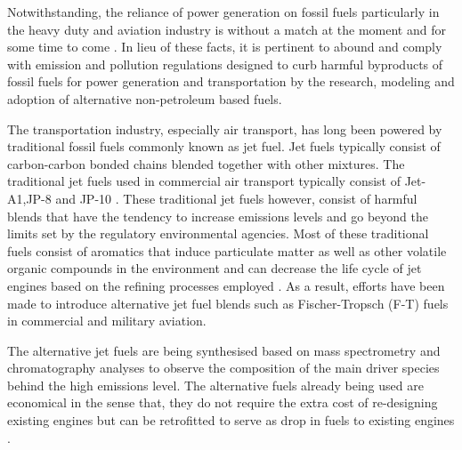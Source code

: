 Notwithstanding, the reliance of power generation on fossil fuels particularly in the heavy duty and aviation industry is without a match at the moment and for some time to come \cite{NationalsAcademiesofSciences2016CommercialResearch}. In lieu of these facts, it is pertinent to abound and comply with emission and pollution regulations designed to curb harmful byproducts of fossil fuels for power generation and transportation by the research, modeling and adoption of alternative non-petroleum based fuels. 

The transportation industry, especially air transport, has long been powered by traditional fossil fuels commonly known as jet fuel. Jet fuels typically consist of carbon-carbon bonded chains blended together with other mixtures. The traditional jet fuels used in commercial air transport typically consist of Jet-A1,JP-8 and JP-10 \cite{NationalsAcademiesofSciences2016CommercialResearch}. These traditional jet fuels however, consist of harmful blends that have the tendency to increase emissions levels and go beyond the limits set by the regulatory environmental agencies. Most of these traditional fuels consist of aromatics that induce particulate matter as well as other volatile organic compounds in the environment and can decrease the life cycle of jet engines based on the refining processes employed \cite{Corporan2007EmissionsFuel}. As a result, efforts have been made to introduce alternative jet fuel blends such as Fischer-Tropsch (F-T) fuels in commercial and military aviation. 

The alternative jet fuels are being synthesised based on mass spectrometry and chromatography analyses to observe the composition of the main driver species behind the high emissions level. The alternative fuels already being used are economical in the sense that, they do not require the extra cost of re-designing existing engines but can be retrofitted to serve as drop in fuels to existing engines \cite{NationalsAcademiesofSciences2016CommercialResearch}. 

